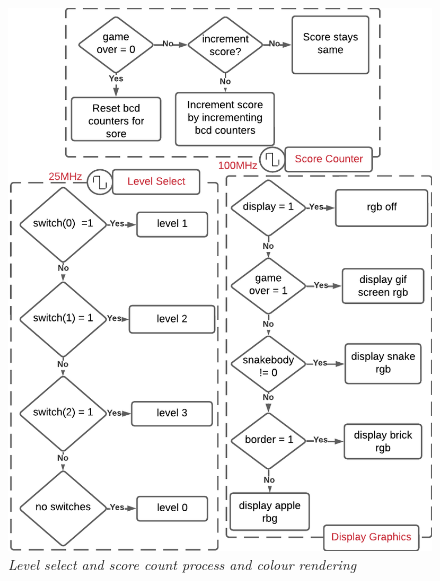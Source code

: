 \documentclass[aps, secnumarabic, balancelastpage, asmath, amssymb, nofootinbib, floatfix,]{revtex4-2}
\begin{document}
{\clearpage

\begin{figure}
    \centering
    \includegraphics[scale = 0.65]{score.pdf}
    \caption{\em Level select and score count process and colour rendering}
    \label{fig:4}
\end{figure}

}
\end{document}
